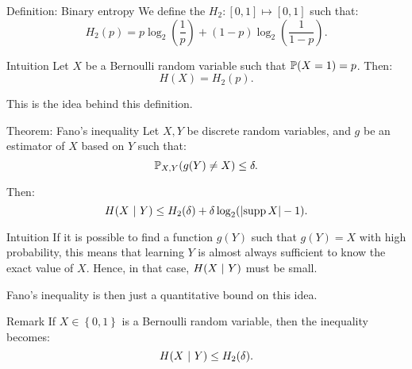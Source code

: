 \documentclass[a4paper]{article}
\begin{document}
\begin{parag}{Definition: Binary entropy}
    We define the  $H_2: \left[0, 1\right] \mapsto \left[0, 1\right]$ such that: 
    \[H_2\left(p\right) = p \log_2\left(\frac{1}{p}\right) + \left(1-p\right) \log_2\left(\frac{1}{1-p}\right).\]
    
    \begin{subparag}{Intuition}
        Let $X$ be a Bernoulli random variable such that $\prob\left(X = 1\right) = p$. Then: 
        \[H\left(X\right) = H_2\left(p\right).\]

        This is the idea behind this definition.
    \end{subparag}
\end{parag}

\begin{parag}{Theorem: Fano's inequality}
    Let $X, Y$ be discrete random variables, and $g$ be an estimator of $X$ based on $Y$ such that: 
    \[\prob_{X, Y}\left(g\left(Y\right) \neq X\right) \leq \delta.\]
    
    Then: 
    \[H\left(X \suchthat Y\right) \leq H_2\left(\delta\right) + \delta \log_2\left(\left|\supp X\right| - 1\right).\]

    \begin{subparag}{Intuition}
        If it is possible to find a function $g\left(Y\right)$ such that $g\left(Y\right) = X$ with high probability, this means that learning $Y$ is almost always sufficient to know the exact value of $X$. Hence, in that case, $H\left(X \suchthat Y\right)$ must be small.

        Fano's inequality is then just a quantitative bound on this idea.
    \end{subparag}

    \begin{subparag}{Remark}
        If $X \in \left\{0, 1\right\}$ is a Bernoulli random variable, then the inequality becomes: 
        \[H\left(X \suchthat Y\right) \leq H_2\left(\delta\right).\]
    \end{subparag}
\end{parag}
\end{document}
